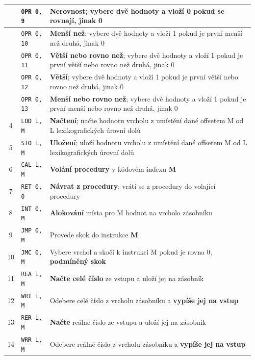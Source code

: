 \documentclass[
12pt,
a4paper,
pdftex,
czech,
titlepage
]{report}
\begin{document}
\begin{longtable}{|c|l|p{10cm}|}
\rule{0pt}{3ex} & \texttt{OPR 0, 9} & \textbf{Nerovnost}; vybere dvě hodnoty a vloží 0 pokud se rovnají, jinak 0 \\ \hline
\rule{0pt}{3ex} & \texttt{OPR 0, 10} & \textbf{Menší než}; vybere dvě hodnoty a vloží 1 pokud je první menší než druhá, jinak 0 \\ \hline
\rule{0pt}{3ex} & \texttt{OPR 0, 11} & \textbf{Větší nebo rovno než}; vybere dvě hodnoty a vloží 1 pokud je první větší nebo rovno než druhá, jinak 0 \\ \hline
\rule{0pt}{3ex} & \texttt{OPR 0, 12} & \textbf{Větší}; vybere dvě hodnoty a vloží 1 pokud je první větší nebo rovno než druhá, jinak 0 \\ \hline
\rule{0pt}{3ex} & \texttt{OPR 0, 13} & \textbf{Menší nebo rovno než}; vybere dvě hodnoty a vloží 1 pokud je první menší nebo rovno než druhá, jinak 0 \\ \hline
\rule{0pt}{3ex}4 & \texttt{LOD L, M} & \textbf{Načtení}; načte hodnotu vrcholu z umístění dané offsetem M od L lexikografických úrovní dolů \\ \hline
\rule{0pt}{3ex}5 & \texttt{STO L, M} & \textbf{Uložení}; uloží hodnotu vrcholu z umístění dané offsetem M od L lexikografických úrovní dolů \\ \hline
\rule{0pt}{3ex}6 & \texttt{CAL L, M} & \textbf{Volání procedury} v kódovém indexu \textbf{M} \\ \hline
\rule{0pt}{3ex}7 & \texttt{RET 0, 0} & \textbf{Návrat z procedury}; vrátí se z procedury do volající procedury \\ \hline
\rule{0pt}{3ex}8 & \texttt{INT 0, M} & \textbf{Alokování} místa pro M hodnot na vrcholo zásobníku \\ \hline
\rule{0pt}{3ex}9 & \texttt{JMP 0, M} & Provede skok do instrukce \textbf{M} \\ \hline
\rule{0pt}{3ex}10 & \texttt{JMC 0, M} & Vybere vrchol a skočí k instrukci M pokud je rovna 0, \textbf{podmíněný skok} \\ \hline
\rule{0pt}{3ex}11 & \texttt{REA L, M} & \textbf{Načte celé číslo} ze vstupu a uloží jej na zásobník \\ \hline
\rule{0pt}{3ex}12 & \texttt{WRI L, M} & Odebere celé číslo z vrcholu zásobníku a \textbf{vypíše jej na vstup} \\ \hline
\rule{0pt}{3ex}13 & \texttt{RER L, M} & \textbf{Načte} reálné číslo ze vstupu a uloží jej na zásobník \\ \hline
\rule{0pt}{3ex}14 & \texttt{WRR L, M} & Odebere reálné číslo z vrcholu zásobníku a \textbf{vypíše jej na vstup} \\ \hline

\end{longtable}
\end{document}

